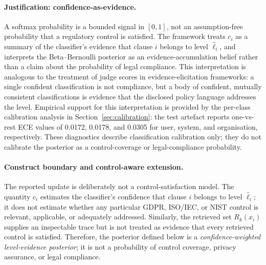 \documentclass[final,3p,times,twocolumn]{elsarticle}
\begin{document}
	\paragraph{Justification: confidence-as-evidence.}
	A softmax probability is a bounded signal in $[0,1]$, not an assumption-free probability
	that a regulatory control is satisfied. The framework treats $c_{i}$ as a
	summary of the classifier's evidence that clause $i$ belongs to level
	$\hat{\ell}_{i}$, and interprets the Beta--Bernoulli posterior as an evidence-accumulation
	belief rather than a claim about the probability of legal compliance. This interpretation
	is analogous to the treatment of judge scores in evidence-elicitation frameworks:
	a single confident classification is not compliance, but a body of confident,
	mutually consistent classifications is evidence that the disclosed policy
	language addresses the level. Empirical support for this interpretation is provided
	by the per-class calibration analysis in Section~\ref{sec:calibration}: the
	test artefact reports one-vs-rest ECE values of 0.0172, 0.0178, and 0.0305
	for user, system, and organisation, respectively. These diagnostics describe
	classification calibration only; they do not calibrate the posterior as a
	control-coverage or legal-compliance probability.

	\paragraph{Construct boundary and control-aware extension.}
	The reported update is deliberately not a control-satisfaction model. The
	quantity $c_i$ estimates the classifier's confidence that clause $i$ belongs
	to level $\hat{\ell}_i$; it does not estimate whether any particular GDPR,
	ISO/IEC, or NIST control is relevant, applicable, or adequately addressed.
	Similarly, the retrieved set $R_k(x_i)$ supplies an inspectable trace but is
	not treated as evidence that every retrieved control is satisfied. Therefore,
	the posterior defined below is a \emph{confidence-weighted level-evidence
	posterior}; it is not a probability of control coverage, privacy assurance,
	or legal compliance.
\end{document}
